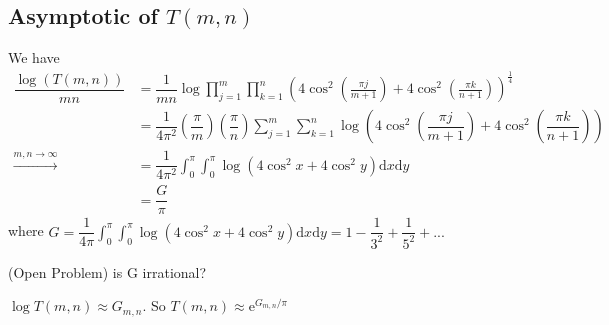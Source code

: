 \subsection{Asymptotic of $T(m,n)$}
We have
\begin{align*}
\dfrac{\log (T(m,n))}{mn} &= \dfrac{1}{mn} \log \prod_{j=1}^{m}\prod_{k=1}^n(4\cos^2(\frac{\pi j}{m+1})+4\cos^2(\frac{\pi k}{n+1}))^{\frac{1}{4}}\\
&=\dfrac{1}{4\pi^2}(\dfrac{\pi}{m})(\dfrac{\pi}{n})\sum\limits_{j=1}^m\sum_{k=1}^n\log (4\cos^2(\dfrac{\pi j}{m+1})+4\cos^2(\dfrac{\pi k}{n+1}))\\
\xrightarrow{m,n \rightarrow \infty}&=\dfrac{1}{4\pi^2}\int_0^{\pi}\int_0^{\pi}\log(4\cos ^2x+4\cos^2y)\mathrm{d}x \mathrm{d}y\\
&=\dfrac{G}{\pi}
\end{align*}
where $G = \dfrac{1}{4\pi}\int_0^{\pi}\int_0^{\pi}\log(4\cos ^2x+4\cos^2y)\mathrm{d}x \mathrm{d}y=1-\dfrac{1}{3^2}+\dfrac{1}{5^2}+...$

(Open Problem) is G irrational?

$\log T(m,n) \approx G_{m,n}$. So $T(m,n) \approx \mathrm{e}^{G_{m,n}/\pi}$

